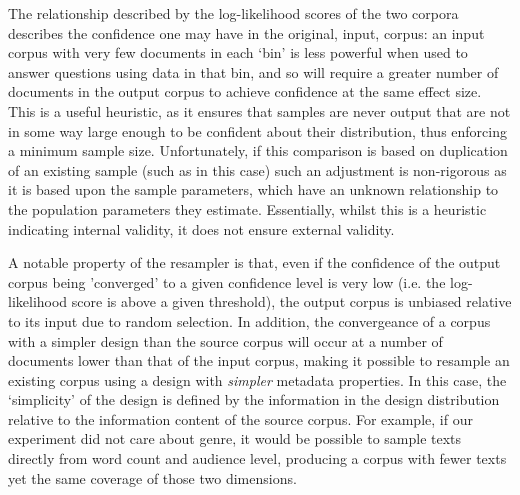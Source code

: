 













The relationship described by the log-likelihood scores of the two corpora describes the confidence one may have in the original, input, corpus: an input corpus with very few documents in each `bin' is less powerful when used to answer questions using data in that bin, and so will require a greater number of documents in the output corpus to achieve confidence at the same effect size.  This is a useful heuristic, as it ensures that samples are never output that are not in some way large enough to be confident about their distribution, thus enforcing a minimum sample size.  Unfortunately, if this comparison is based on duplication of an existing sample (such as in this case) such an adjustment is non-rigorous as it is based upon the sample parameters, which have an unknown relationship to the population parameters they estimate.  Essentially, whilst this is a heuristic indicating internal validity, it does not ensure external validity.

A notable property of the resampler is that, even if the confidence of the output corpus being 'converged' to a given confidence level is very low (i.e. the log-likelihood score is above a given threshold), the output corpus is unbiased relative to its input due to random selection.  In addition, the convergeance of a corpus with a simpler design than the source corpus will occur at a number of documents lower than that of the input corpus, making it possible to resample an existing corpus using a design with \textit{simpler} metadata properties.  In this case, the `simplicity' of the design is defined by the information in the design distribution relative to the information content of the source corpus.  For example, if our experiment did not care about genre, it would be possible to sample texts directly from word count and audience level, producing a corpus with fewer texts yet the same coverage of those two dimensions.






